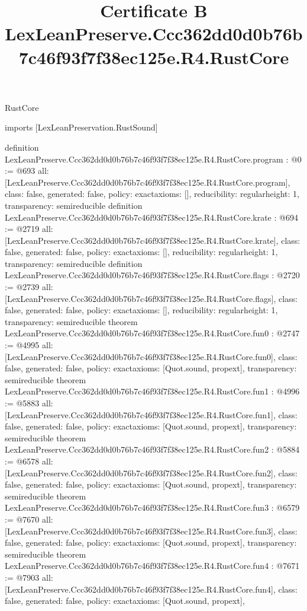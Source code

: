 \begin{lexlean}{RustCore}
\title{Certificate B LexLeanPreserve.Ccc362dd0d0b76b7c46f93f7f38ec125e.R4.RustCore}
\begin{coremodule}
imports [LexLeanPreservation.RustSound]

definition LexLeanPreserve.Ccc362dd0d0b76b7c46f93f7f38ec125e.R4.RustCore.program : @0 := @693 {
  all: [LexLeanPreserve.Ccc362dd0d0b76b7c46f93f7f38ec125e.R4.RustCore.program],
  class: false,
  generated: false,
  policy: exact{axioms: []},
  reducibility: regular{height: 1},
  transparency: semireducible
}
definition LexLeanPreserve.Ccc362dd0d0b76b7c46f93f7f38ec125e.R4.RustCore.krate : @694 := @2719 {
  all: [LexLeanPreserve.Ccc362dd0d0b76b7c46f93f7f38ec125e.R4.RustCore.krate],
  class: false,
  generated: false,
  policy: exact{axioms: []},
  reducibility: regular{height: 1},
  transparency: semireducible
}
definition LexLeanPreserve.Ccc362dd0d0b76b7c46f93f7f38ec125e.R4.RustCore.flags : @2720 := @2739 {
  all: [LexLeanPreserve.Ccc362dd0d0b76b7c46f93f7f38ec125e.R4.RustCore.flags],
  class: false,
  generated: false,
  policy: exact{axioms: []},
  reducibility: regular{height: 1},
  transparency: semireducible
}
theorem LexLeanPreserve.Ccc362dd0d0b76b7c46f93f7f38ec125e.R4.RustCore.fun0 : @2747 := @4995 {
  all: [LexLeanPreserve.Ccc362dd0d0b76b7c46f93f7f38ec125e.R4.RustCore.fun0],
  class: false,
  generated: false,
  policy: exact{axioms: [Quot.sound, propext]},
  transparency: semireducible
}
theorem LexLeanPreserve.Ccc362dd0d0b76b7c46f93f7f38ec125e.R4.RustCore.fun1 : @4996 := @5883 {
  all: [LexLeanPreserve.Ccc362dd0d0b76b7c46f93f7f38ec125e.R4.RustCore.fun1],
  class: false,
  generated: false,
  policy: exact{axioms: [Quot.sound, propext]},
  transparency: semireducible
}
theorem LexLeanPreserve.Ccc362dd0d0b76b7c46f93f7f38ec125e.R4.RustCore.fun2 : @5884 := @6578 {
  all: [LexLeanPreserve.Ccc362dd0d0b76b7c46f93f7f38ec125e.R4.RustCore.fun2],
  class: false,
  generated: false,
  policy: exact{axioms: [Quot.sound, propext]},
  transparency: semireducible
}
theorem LexLeanPreserve.Ccc362dd0d0b76b7c46f93f7f38ec125e.R4.RustCore.fun3 : @6579 := @7670 {
  all: [LexLeanPreserve.Ccc362dd0d0b76b7c46f93f7f38ec125e.R4.RustCore.fun3],
  class: false,
  generated: false,
  policy: exact{axioms: [Quot.sound, propext]},
  transparency: semireducible
}
theorem LexLeanPreserve.Ccc362dd0d0b76b7c46f93f7f38ec125e.R4.RustCore.fun4 : @7671 := @7903 {
  all: [LexLeanPreserve.Ccc362dd0d0b76b7c46f93f7f38ec125e.R4.RustCore.fun4],
  class: false,
  generated: false,
  policy: exact{axioms: [Quot.sound, propext]},
}
\end{coremodule}
\end{lexlean}
